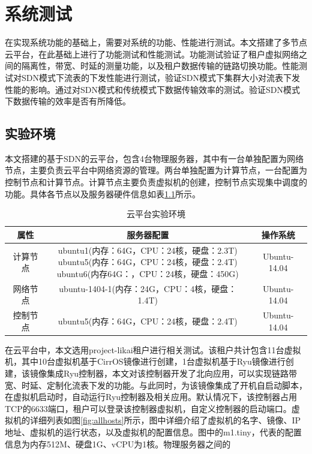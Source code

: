 \chapter{系统测试}
在实现系统功能的基础上，需要对系统的功能、性能进行测试。本文搭建了多节点云平台，在此基础上进行了功能测试和性能测试。功能测试验证了租户虚拟网络之间的隔离性，带宽、时延的测量功能，以及租户数据传输的链路切换功能。性能测试对SDN模式下流表的下发性能进行测试，验证SDN模式下集群大小对流表下发性能的影响。通过对SDN模式和传统模式下数据传输效率的测试。验证SDN模式下数据传输的效率是否有所降低。
\section{实验环境}
本文搭建的基于SDN的云平台，包含4台物理服务器，其中有一台单独配置为网络节点，主要负责云平台中网络资源的管理。两台单独配置为计算节点，一台配置为控制节点和计算节点。计算节点主要负责虚拟机的创建，控制节点实现集中调度的功能。具体各节点以及服务器硬件信息如表\ref{table:environment}所示。

\begin{table}[!htb]
    \centering
	\caption{云平台实验环境}
	\label{table:environment}
	\begin{tabular}{|c|c|c|}
	\hline 
	属性 & 服务器配置 & 操作系统 \\
	\hline
	计算节点& \enter{ubuntu1(内存：64G，CPU：24核，硬盘：2.3T) \\ubuntu5(内存：64G，CPU：24核，硬盘：2.4T)\\ ubuntu6(内存64G：，CPU：24核，硬盘：450G)} & Ubuntu-14.04 \\
	\hline
	网络节点 & ubuntu-1404-1(内存：24G，CPU：4核，硬盘：1.4T) & Ubuntu-14.04 \\
	\hline
	控制节点 & ubuntu5(内存：64G，CPU：24核，硬盘：2.4T) & Ubuntu-14.04 \\
	\hline
	\end{tabular}
\end{table}

在云平台中，本文选用project-likai租户进行相关测试。该租户共计包含11台虚拟机，其中10台虚拟机基于CirrOS镜像进行创建，1台虚拟机基于Ryu镜像进行创建，该镜像集成Ryu控制器，本文对该控制器开发了北向应用，可以实现链路带宽、时延、定制化流表下发的功能。与此同时，为该镜像集成了开机自启动脚本，在虚拟机启动时，自动运行Ryu控制器及相关应用。默认情况下，该控制器占用TCP的6633端口，租户可以登录该控制器虚拟机，自定义控制器的启动端口。虚拟机的详细列表如图\ref{fig:allhosts}所示，图中详细介绍了虚拟机的名字、镜像、IP地址、虚拟机的运行状态，以及虚拟机的配置信息。图中的m1.tiny，代表的配置信息为内存512M、硬盘1G、vCPU为1核。物理服务器之间的

